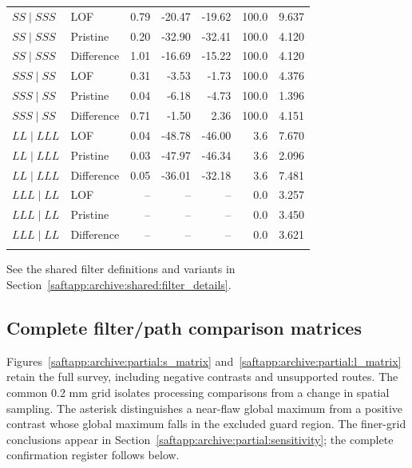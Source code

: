 {\begin{longtable}{@{}llrrrrr@{}}
\addlinespace
$SS\mid SSS$ & LOF & 0.79 & -20.47 & -19.62 & 100.0 & 9.637 \\
$SS\mid SSS$ & Pristine & 0.20 & -32.90 & -32.41 & 100.0 & 4.120 \\
$SS\mid SSS$ & Difference & 1.01 & -16.69 & -15.22 & 100.0 & 4.120 \\
\addlinespace
$SSS\mid SS$ & LOF & 0.31 & -3.53 & -1.73 & 100.0 & 4.376 \\
$SSS\mid SS$ & Pristine & 0.04 & -6.18 & -4.73 & 100.0 & 1.396 \\
$SSS\mid SS$ & Difference & 0.71 & -1.50 & 2.36 & 100.0 & 4.151 \\
\addlinespace
$LL\mid LLL$ & LOF & 0.04 & -48.78 & -46.00 & 3.6 & 7.670 \\
$LL\mid LLL$ & Pristine & 0.03 & -47.97 & -46.34 & 3.6 & 2.096 \\
$LL\mid LLL$ & Difference & 0.05 & -36.01 & -32.18 & 3.6 & 7.481 \\
\addlinespace
$LLL\mid LL$ & LOF & -- & -- & -- & 0.0 & 3.257 \\
$LLL\mid LL$ & Pristine & -- & -- & -- & 0.0 & 3.450 \\
$LLL\mid LL$ & Difference & -- & -- & -- & 0.0 & 3.621 \\
\addlinespace
\end{longtable}}

See the shared filter definitions and variants in Section~\ref{saftapp:archive:shared:filter_details}.
\subsection{Complete filter/path comparison matrices}
Figures~\ref{saftapp:archive:partial:s_matrix} and~\ref{saftapp:archive:partial:l_matrix} retain the full survey, including negative contrasts and unsupported routes. The common 0.2 mm grid isolates processing comparisons from a change in spatial sampling. The asterisk distinguishes a near-flaw global maximum from a positive contrast whose global maximum falls in the excluded guard region. The finer-grid conclusions appear in Section~\ref{saftapp:archive:partial:sensitivity}; the complete confirmation register follows below.


